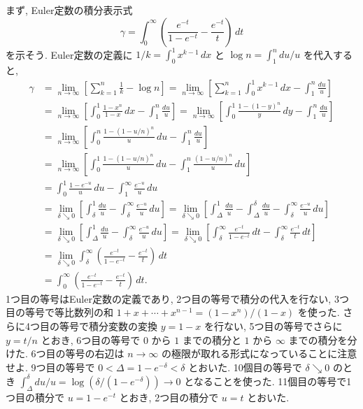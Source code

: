 \documentclass[12pt,twoside]{jarticle}
\theoremstyle{jplain}
\theoremstyle{jplain}
\theoremstyle{jplain}
\numberwithin{theorem}{section}
\numberwithin{equation}{section}
\numberwithin{figure}{section}
\numberwithin{table}{section}
\begin{document}
まず, Euler定数の積分表示式
\[
\gamma 
= \int_0^\infty\left(\frac{e^{-t}}{1-e^{-t}}-\frac{e^{-t}}{t}\right)\,dt
\]
を示そう. 
Euler定数の定義に $1/k=\int_0^1 x^{k-1}\,dx$ 
と $\log n=\int_1^n du/u$ を代入すると,
\begin{align*}
\gamma
&
=\lim_{n\to\infty}\left[\sum_{k=1}^n \frac{1}{k} - \log n\right]
=\lim_{n\to\infty}\left[\sum_{k=1}^n \int_0^1 x^{k-1}\,dx - \int_1^n \frac{du}{u}\right]
\\ &
=\lim_{n\to\infty}\left[\int_0^1\frac{1-x^n}{1-x}\,dx - \int_1^n \frac{du}{u}\right]
=\lim_{n\to\infty}\left[\int_0^1\frac{1-(1-y)^n}{y}\,dy - \int_1^n \frac{du}{u}\right]
\\ &
=\lim_{n\to\infty}\left[\int_0^n\frac{1-(1-u/n)^n}{u}\,du - \int_1^n \frac{du}{u}\right]
\\ &
=\lim_{n\to\infty}
\left[\int_0^1\frac{1-(1-u/n)^n}{u}\,du - \int_1^n \frac{(1-u/n)^n}{u}\,du\right]
\\ &
= \int_0^1 \frac{1-e^{-u}}{u}\,du - \int_1^\infty \frac{e^{-u}}{u}\,du
\\ &
= \lim_{\delta\searrow 0}
\left[ \int_\delta^1 \frac{du}{u} - \int_\delta^\infty \frac{e^{-u}}{u}\,du \right]
= \lim_{\delta\searrow 0}
\left[
 \int_\Delta^1 \frac{du}{u}
-\int_\Delta^\delta \frac{du}{u}
-\int_\delta^\infty \frac{e^{-u}}{u}\,du
\right]
\\ &
= \lim_{\delta\searrow 0}
\left[ \int_\Delta^1 \frac{du}{u} - \int_\delta^\infty \frac{e^{-u}}{u}\,du \right]
= \lim_{\delta\searrow 0}
\left[
   \int_\delta^\infty \frac{e^{-t}}{1-e^{-t}}\,dt 
 - \int_\delta^\infty \frac{e^{-t}}{t}\,dt
\right]
\\ &
= \lim_{\delta\searrow 0}
\int_\delta^\infty
\left( 
  \frac{e^{-t}}{1-e^{-t}}
 -\frac{e^{-t}}{t}
\right) \,dt
\\ &
= \int_0^\infty
\left( 
  \frac{e^{-t}}{1-e^{-t}}
 -\frac{e^{-t}}{t}
\right)\,dt.
\end{align*}
1つ目の等号はEuler定数の定義であり, 2つ目の等号で積分の代入を行ない, 
3つ目の等号で等比数列の和 $1+x+\cdots+x^{n-1}=(1-x^n)/(1-x)$ を使った.
さらに4つ目の等号で積分変数の変換 $y=1-x$ を行ない, 
5つ目の等号でさらに $y=t/n$ とおき,
6つ目の等号で $0$ から $1$ までの積分と $1$ から $\infty$ までの積分を分けた.
6つ目の等号の右辺は $n\to\infty$ の極限が取れる形式になっていることに注意せよ.
9つ目の等号で $0<\Delta=1-e^{-\delta}<\delta$ とおいた.
10個目の等号で $\delta\searrow 0$ のとき 
$\int_\Delta^\delta du/u=\log(\delta/(1-e^{-\delta}))\to 0$ となることを使った.
11個目の等号で1つ目の積分で $u=1-e^{-t}$ とおき, 2つ目の積分で $u=t$ とおいた.
\end{document}
